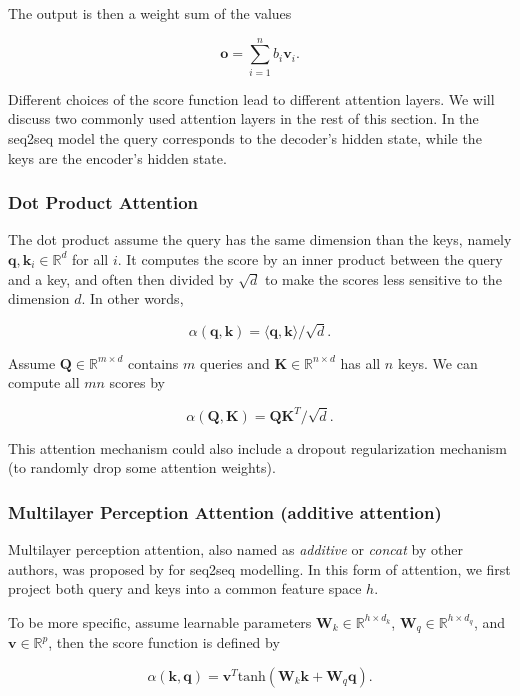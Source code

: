 The output is then a weight sum of the values

$$\mathbf o = \sum_{i=1}^n b_i \mathbf v_i.$$

Different choices of the score function lead to different attention layers. We will discuss two commonly used attention layers in the rest of this section. In the seq2seq model the query corresponds to the decoder's hidden state, while the keys are the encoder's hidden state.

\subsubsection{Dot Product Attention}

The dot product assume the query has the same dimension than the keys, namely $\mathbf q, \mathbf k_i \in\mathbb R^d$ for all $i$. It computes the score by an inner product between the query and a key, and often then divided by $\sqrt{d}$ to make the scores less sensitive to the dimension $d$. In other words,

$$\alpha(\mathbf q, \mathbf k) = \langle \mathbf q, \mathbf k \rangle /\sqrt{d}.$$

Assume $\mathbf Q\in\mathbb R^{m\times d}$ contains $m$ queries and $\mathbf K\in\mathbb R^{n\times d}$ has all $n$ keys. We can compute all $mn$ scores by

$$\alpha(\mathbf Q, \mathbf K) = \mathbf Q \mathbf K^T /\sqrt{d}.$$

This attention mechanism could also include a dropout regularization mechanism (to randomly drop some attention weights).

\subsubsection{Multilayer Perception Attention (additive attention)}

Multilayer perception attention, also named as \textit{additive} or \textit{concat} by other authors, was proposed by \citet{Bahdanau2015} for seq2seq modelling. In this form of attention, we first project both query and keys into a common feature space $h$.

To be more specific, assume learnable parameters $\mathbf W_k\in\mathbb R^{h\times d_k}$, $\mathbf W_q\in\mathbb R^{h\times d_q}$, and $\mathbf v\in\mathbb R^{p}$, then the score function is defined by

$$\alpha(\mathbf k, \mathbf q) = \mathbf v^T \text{tanh}(\mathbf W_k \mathbf k + \mathbf W_q\mathbf q). $$

